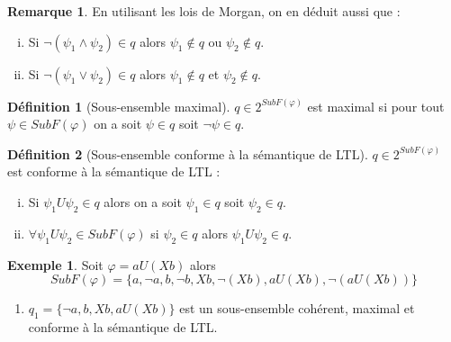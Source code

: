 \documentclass[12pt,a4paper]{article}
\theoremstyle{plain}
\theoremstyle{definition}
\newtheorem{defi}{Définition}
\newtheorem{rmq}{Remarque}
\newtheorem{ex}{Exemple}
\begin{document}
\begin{rmq}
  En utilisant les lois de Morgan, on en déduit aussi que :
  \begin{enumerate}[(i)]
  \item Si $\lnot (\psi_1 \land \psi_2) \in q$ alors $\psi_1 \not \in q$ ou $\psi_2 \not \in q$.
  \item Si $\lnot (\psi_1 \lor \psi_2) \in q$ alors $\psi_1 \not \in q$ et $\psi_2 \not \in q$.
  \end{enumerate}
\end{rmq}


\begin{defi}[Sous-ensemble maximal]
  $q \in 2^{SubF(\varphi)}$ est maximal si pour tout $\psi \in SubF(\varphi)$ on a soit $\psi \in q$ soit $\lnot \psi \in q$.  
\end{defi}

\begin{defi}[Sous-ensemble conforme à la sémantique de LTL]
  \label{ss-ens-ok-ltl}
  $q \in 2^{SubF(\varphi)}$ est conforme à la sémantique de LTL :
  \begin{enumerate}[(i)]
  \item Si $\psi_1 U \psi_2 \in q$ alors on a soit $\psi_1 \in q$ soit $\psi_2 \in q$.
  \item $\forall \psi_1 U \psi_2 \in SubF(\varphi)$ si $\psi_2 \in q$ alors $\psi_1 U \psi_2 \in q$.
  \end{enumerate}
\end{defi}

\begin{ex}
  Soit $\varphi = a U (Xb)$ alors
  \[
    SubF(\varphi) = \{a, \lnot a, b, \lnot b, Xb, \lnot (Xb), a U (Xb), \lnot (aU(Xb))\}
  \]
  \begin{enumerate}
  \item $q_1 = \{\lnot a, b, Xb, a U (Xb)\}$ est un sous-ensemble cohérent, maximal et conforme à la sémantique de LTL.
  \end{enumerate}
\end{ex}
\end{document}
